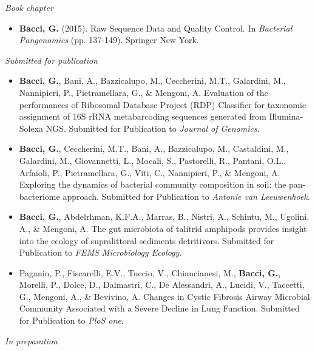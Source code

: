 \noindent \textit{Book chapter}
\begin{itemize}

\item \textbf{Bacci, G.} (2015). Raw Sequence Data and Quality Control. In \textit{Bacterial Pangenomics} (pp. 137-149). Springer New York.

\end{itemize}


\noindent \textit{Submitted for publication}

\begin{itemize}

\item \textbf{Bacci, G.}, Bani, A., Bazzicalupo, M., Ceccherini, M.T., Galardini, M., Nannipieri, P., Pietramellara, G., \& Mengoni, A. Evaluation of the performances of Ribosomal Database Project (RDP) Classifier for taxonomic assignment of 16S rRNA metabarcoding sequences generated from Illumina-Solexa NGS. Submitted for Publication to \textit{Journal of Genomics}.

\item \textbf{Bacci, G.}, Ceccherini, M.T., Bani, A., Bazzicalupo, M., Castaldini, M., Galardini, M., Giovannetti, L., Mocali, S., Pastorelli, R., Pantani, O.L., Arfaioli, P., Pietramellara, G., Viti, C., Nannipieri, P., \& Mengoni, A. Exploring the dynamics of bacterial community composition in soil: the pan-bacteriome approach. Submitted for Publication to \textit{Antonie van Leeuwenhoek}.

\item \textbf{Bacci, G.}, Abdelrhman, K.F.A., Marras, B., Nistri, A., Schintu, M., Ugolini, A., \& Mengoni, A. The gut microbiota of talitrid amphipods provides insight into the ecology of supralittoral sediments detritivors. Submitted for Publication to \textit{FEMS Microbiology Ecology}.

\item Paganin, P., Fiscarelli, E.V., Tuccio, V., Chiancianesi, M., \textbf{Bacci, G.}, Morelli, P., Dolce, D., Dalmastri, C., De Alessandri, A., Lucidi, V., Taccetti, G., Mengoni, A., \& Bevivino, A. Changes in Cystic Fibrosis Airway Microbial Community Associated
with a Severe Decline in Lung Function. Submitted for Publication to \textit{PloS one}.

\end{itemize}


\textit{In preparation}

